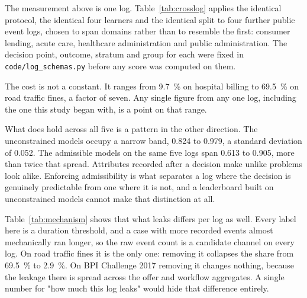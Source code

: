 The measurement above is one log. Table~\ref{tab:crosslog} applies the identical
protocol, the identical four learners and the identical split to four further public event
logs, chosen to span domains rather than to resemble the first: consumer lending, acute
care, healthcare administration and public administration. The decision point, outcome,
stratum and group for each were fixed in \texttt{code/log{\_}schemas.py} before any
score was computed on them.

\begin{table}[htbp]
\centering
\caption{The admissibility protocol across five logs and four domains. Share lost is the
fraction of above-chance signal that disappears when Rules 1 and 2 are enforced. Sepsis
carries \num{961} cases and five groups, so every figure on that row has a wide interval.}
\label{tab:crosslog}
\small

\end{table}

The cost is not a constant. It ranges from \SI{9.7}{\percent} on hospital billing to
\SI{69.5}{\percent} on road traffic fines, a factor of seven. Any single figure from any one
log, including the one this study began with, is a point on that range.

What does hold across all five is a pattern in the other direction. The unconstrained models
occupy a narrow band, \num{0.824} to \num{0.979}, a standard deviation of \num{0.052}. The
admissible models on the same five logs span \num{0.613} to \num{0.905}, more than twice that
spread. Attributes recorded after a decision make unlike problems look alike. Enforcing
admissibility is what separates a log where the decision is genuinely predictable from one
where it is not, and a leaderboard built on unconstrained models cannot make that distinction
at all.

Table~\ref{tab:mechanism} shows that what leaks differs per log as well. Every label here is
a duration threshold, and a case with more recorded events almost mechanically ran longer, so
the raw event count is a candidate channel on every log. On road traffic fines it is the only
one: removing it collapses the share from \SI{69.5}{\percent} to \SI{2.9}{\percent}. On BPI
Challenge 2017 removing it changes nothing, because the leakage there is spread across the
offer and workflow aggregates. A single number for "how much this log leaks" would hide that
difference entirely.

\begin{table}[htbp]
\centering
\caption{What the leakage consists of, per log. Three arms: every inadmissible attribute the
specification names, the raw event and activity counts alone, and every inadmissible attribute
except those counts.}
\label{tab:mechanism}
\small

\end{table}

